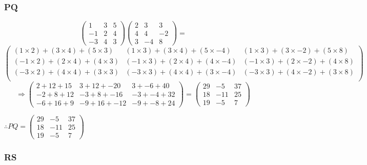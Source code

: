 \documentclass{article}
\begin{document}
\subsubsection{PQ}
\[
	\begin{pmatrix}
		1 & 3 & 5\\
		-1 & 2 & 4\\
		-3 & 4 & 3
	\end{pmatrix}
	\begin{pmatrix}
		2 & 3 & 3\\
		4 & 4 & -2\\
		3 & -4 & 8
	\end{pmatrix}
	=
\]
\[
	\begin{pmatrix}
		(1\times2)+(3\times4)+(5\times3) & (1\times3)+(3\times4)+(5\times-4) & (1\times3)+(3\times-2)+(5\times8)\\
		(-1\times2)+(2\times4)+(4\times3) & (-1\times3)+(2\times4)+(4\times-4) & (-1\times3)+(2\times-2)+(4\times8)\\
		(-3\times2)+(4\times4)+(3\times3) & (-3\times3)+(4\times4)+(3\times-4) & (-3\times3)+(4\times-2)+(3\times8)\\
	\end{pmatrix}
\]
\[
	\Rightarrow
	\begin{pmatrix}
		2+12+15 & 3+12+-20 & 3+-6+40\\
		-2+8+12 & -3+8+-16 & -3+-4+32\\
		-6+16+9 & -9+16+-12 & -9+-8+24
	\end{pmatrix}
	=
	\begin{pmatrix}
		29 & -5 & 37\\
		18 & -11 & 25\\
		19 & -5 & 7
	\end{pmatrix}
\]
\begin{center}\vspace{0.5cm}$\therefore
	PQ=
	\begin{pmatrix}
		29 & -5 & 37\\
		18 & -11 & 25\\
		19 & -5 & 7
	\end{pmatrix}
$\end{center}
\subsubsection{RS}
\end{document}
